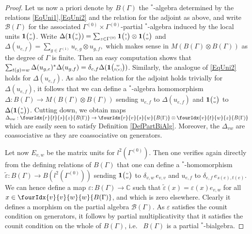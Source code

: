 \documentclass[10pt]{article}
\newcommand{\C}{\mathbb{C}}
\newcommand{\Grt}[3]{#1{\tiny {\begin{pmatrix} #2\\#3\end{pmatrix}}}}
\newcommand{\UnitC}[2]{\Grt{\mathbf{1}}{#1}{#2}}
\newcommand{\Gr}[5]{\fourIdx{#2}{#4}{#3}{#5}{#1}}%
\theoremstyle{definition}
\numberwithin{equation}{section}
\begin{document}
\begin{proof}
Let us now a priori denote by $B(\Gamma)$ the $^*$-algebra determined by the relations \eqref{EqUni1},\eqref{EqUni2} and the relation for the adjoint as above, and write $\mathscr{B}(\Gamma)$ for the associated $\Gamma^{(0)}\times \Gamma^{(0)}$-partial $^*$-algebra induced by the local units $\UnitC{v}{w}$. Write $\Delta(\UnitC{v}{w}) = \sum_{z\in \Gamma^{(0)}} \UnitC{v}{z}\otimes \UnitC{z}{w}$ and $\Delta(u_{e,f}) = \sum_{g\in \Gamma^{(1)}} u_{e,g}\otimes u_{g,f},$ which makes sense in $M(B(\Gamma)\otimes B(\Gamma))$ as the degree of $\Gamma$ is finite. Then an easy computation shows that $ \sum_{t(g)=w}\Delta(u_{g,e})^*\Delta(u_{g,f})= \delta_{e,f} \Delta(\UnitC{w}{t(e)})$. Similarly, the analogue of \eqref{EqUni2} holds for $\Delta(u_{e,f})$. As also the relation for the adjoint holds trivially for $\Delta(u_{e,f})$, it follows that we can define a $^*$-algebra homomorphism $\Delta:B(\Gamma)\rightarrow M(B(\Gamma)\otimes B(\Gamma))$ sending $u_{e,f}$ to $\Delta(u_{e,f})$ and $\UnitC{v}{w}$ to $\Delta(\UnitC{v}{w})$. Cutting down, we obtain maps $\Delta_{vw}:\Gr{B(\Gamma)}{r}{s}{t}{z}\rightarrow \Gr{B(\Gamma)}{r}{s}{v}{w}\otimes \Gr{B(\Gamma)}{v}{w}{t}{z}$ which are easily seen to satisfy Definition \ref{DefPartBiAlg}. Moreover, the $\Delta_{vw}$ are coassociative as they are coassociative on generators.

Let now $E_{v,w}$ be the matrix units for $l^2(\Gamma^{(0)})$. Then one verifies again directly from the defining relations of $B(\Gamma)$ that one can define a $^*$-homomorphism $\widetilde{\varepsilon}: B(\Gamma)\rightarrow B(l^2(\Gamma^{(0)}))$ sending $\UnitC{v}{w}$ to $\delta_{v,w}\, e_{v,v}$ and $u_{e,f}$ to $\delta_{e,f}\, e_{s(e),t(e)}$. We can hence define a map $\varepsilon: B(\Gamma)\rightarrow \C$ such that $\widetilde{\varepsilon}(x) = \varepsilon(x) e_{v,w}$ for all $x\in \Gr{B(\Gamma)}{v}{w}{v}{w}$, and which is zero elsewhere. Clearly it defines a morphism on the partial algebra $\mathscr{B}(\Gamma)$. As $\varepsilon$ satisfies the counit condition on generators, it follows by partial multiplicativity that it satisfies the counit condition on the whole of $B(\Gamma)$, i.e.~ $B(\Gamma)$ is a partial $^*$-bialgebra. 


\end{proof}
\end{document}
